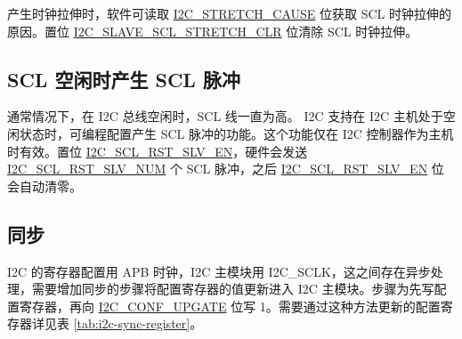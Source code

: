 \documentclass[main\_\_CN.tex]{subfiles}
\begin{document}
产生时钟拉伸时，软件可读取 \hyperref[fielddesc:I2CSTRETCHCAUSE]{I2C\_STRETCH\_CAUSE} 位获取 SCL 时钟拉伸的原因。置位 \hyperref[fielddesc:I2CSLAVESCLSTRETCHCLR]{I2C\_SLAVE\_SCL\_STRETCH\_CLR} 位清除 SCL 时钟拉伸。

\subsection{SCL 空闲时产生 SCL 脉冲}
通常情况下，在 I2C 总线空闲时，SCL 线一直为高。\chipname{} I2C 支持在 I2C 主机处于空闲状态时，可编程配置产生 SCL 脉冲的功能。这个功能仅在 I2C 控制器作为主机时有效。置位 \hyperref[fielddesc:I2CSCLRSTSLVEN]{I2C\_SCL\_RST\_SLV\_EN}，硬件会发送 \hyperref[fielddesc:I2CSCLRSTSLVNUM]{I2C\_SCL\_RST\_SLV\_NUM} 个 SCL 脉冲，之后 \hyperref[fielddesc:I2CSCLRSTSLVEN]{I2C\_SCL\_RST\_SLV\_EN} 位
会自动清零。

\subsection{同步}
I2C 的寄存器配置用 APB 时钟，I2C 主模块用 I2C\_SCLK，这之间存在异步处理，需要增加同步的步骤将配置寄存器的值更新进入 I2C 主模块。步骤为先写配置寄存器，再向 \hyperref[fielddesc:I2CCONFUPGATE]{I2C\_CONF\_UPGATE} 位写 1。需要通过这种方法更新的配置寄存器详见表 \ref{tab:i2c-sync-register}。
\end{document}
